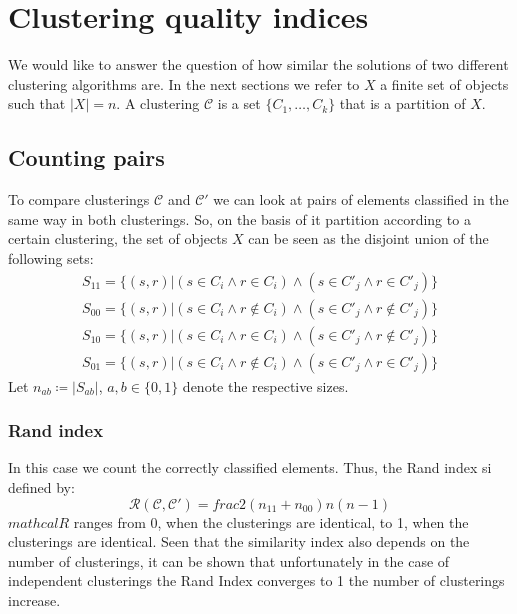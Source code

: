 \section{Clustering quality indices}\label{results_indices}
We would like to answer the question of how similar the solutions of two different clustering algorithms are. In the next sections we refer to $X$ a finite set of objects such that $|X|=n$. A clustering $\mathcal{C}$ is a set $\{C_1,\dots,C_k\}$ that is a partition of $X$.

\subsection{Counting pairs}
To compare clusterings $\mathcal{C}$ and $\mathcal{C}'$ we can look at pairs of elements classified in the same way in both clusterings. So, on the basis of it partition according to a certain clustering, the set of objects $X$ can be seen as the disjoint union of the following sets:
\begin{equation*}
    \begin{gathered}
        S_{11}=\{(s,r)|(s\in C_i\land r\in C_i) \land (s\in C'_j\land r\in C'_j)\}\\
        S_{00}=\{(s,r)|(s\in C_i\land r\notin C_i) \land (s\in C'_j\land r\notin C'_j)\}\\
        S_{10}=\{(s,r)|(s\in C_i\land r\in C_i) \land (s\in C'_j\land r\notin C'_j)\}\\
        S_{01}=\{(s,r)|(s\in C_i\land r\notin C_i) \land (s\in C'_j\land r\in C'_j)\}
    \end{gathered}
\end{equation*}
Let $n_{ab}\coloneqq|S_{ab}|$, $a,b\in\{0,1\}$ denote the respective sizes.
\subsubsection{Rand index}
In this case we count the correctly classified elements. Thus, the Rand index si defined by:
\begin{equation*}
    \mathcal{R}(\mathcal{C},\mathcal{C}')=frac{2(n_{11}+n_{00})}{n(n-1)}
\end{equation*}
$mathcal{R}$ ranges from 0, when the clusterings are identical, to 1, when the clusterings are identical. Seen that the similarity index also depends on the number of clusterings, it can be shown that unfortunately in the case of independent clusterings the Rand Index converges to 1 the number of clusterings increase.


